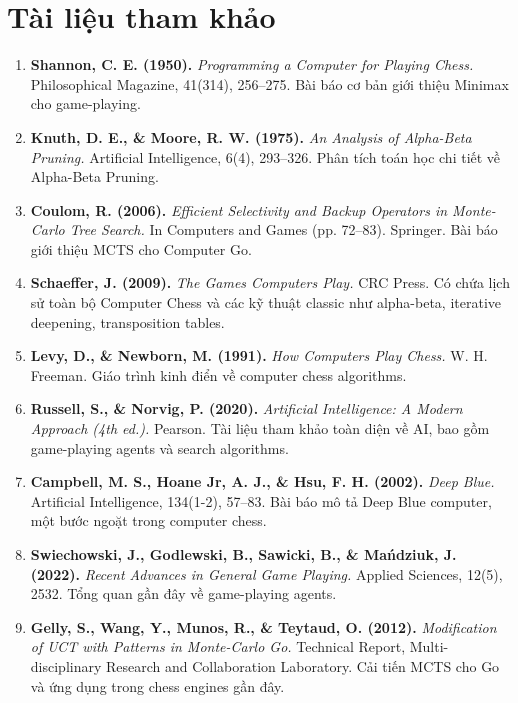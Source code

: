 \section{Tài liệu tham khảo}

\begin{enumerate}
    \item \textbf{Shannon, C. E. (1950).} \textit{Programming a Computer for Playing Chess.} Philosophical Magazine, 41(314), 256–275. Bài báo cơ bản giới thiệu Minimax cho game-playing.

    \item \textbf{Knuth, D. E., \& Moore, R. W. (1975).} \textit{An Analysis of Alpha-Beta Pruning.} Artificial Intelligence, 6(4), 293–326. Phân tích toán học chi tiết về Alpha-Beta Pruning.

    \item \textbf{Coulom, R. (2006).} \textit{Efficient Selectivity and Backup Operators in Monte-Carlo Tree Search.} In Computers and Games (pp. 72–83). Springer. Bài báo giới thiệu MCTS cho Computer Go.

    \item \textbf{Schaeffer, J. (2009).} \textit{The Games Computers Play.} CRC Press. Có chứa lịch sử toàn bộ Computer Chess và các kỹ thuật classic như alpha-beta, iterative deepening, transposition tables.

    \item \textbf{Levy, D., \& Newborn, M. (1991).} \textit{How Computers Play Chess.} W. H. Freeman. Giáo trình kinh điển về computer chess algorithms.

    \item \textbf{Russell, S., \& Norvig, P. (2020).} \textit{Artificial Intelligence: A Modern Approach (4th ed.).} Pearson. Tài liệu tham khảo toàn diện về AI, bao gồm game-playing agents và search algorithms.

    \item \textbf{Campbell, M. S., Hoane Jr, A. J., \& Hsu, F. H. (2002).} \textit{Deep Blue.} Artificial Intelligence, 134(1-2), 57–83. Bài báo mô tả Deep Blue computer, một bước ngoặt trong computer chess.

    \item \textbf{Swiechowski, J., Godlewski, B., Sawicki, B., \& Mańdziuk, J. (2022).} \textit{Recent Advances in General Game Playing.} Applied Sciences, 12(5), 2532. Tổng quan gần đây về game-playing agents.

    \item \textbf{Gelly, S., Wang, Y., Munos, R., \& Teytaud, O. (2012).} \textit{Modification of UCT with Patterns in Monte-Carlo Go.} Technical Report, Multi-disciplinary Research and Collaboration Laboratory. Cải tiến MCTS cho Go và ứng dụng trong chess engines gần đây.


\end{enumerate}
